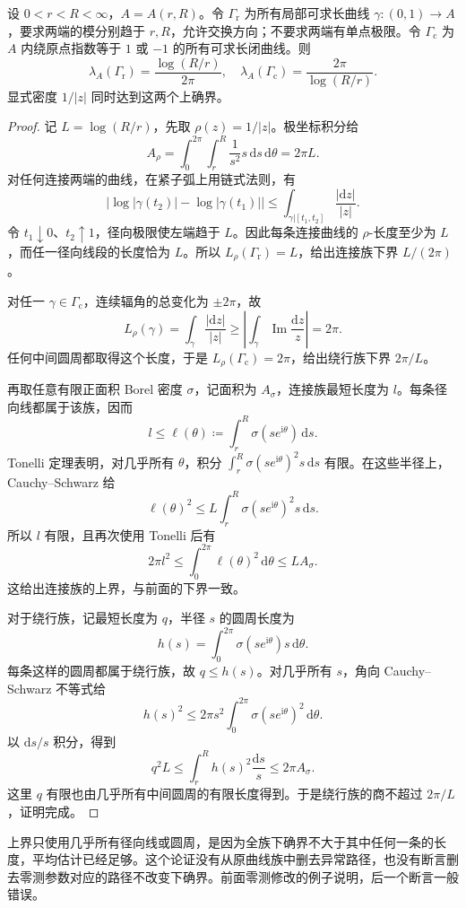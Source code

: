 \begin{theorem}[圆环两类曲线族的极值长度]\label{b3:thm:08-annulus-extremal}
设 \(0<r<R<\infty\)，\(A=A(r,R)\)。令 \(\Gamma_{\mathrm r}\) 为所有局部可求长曲线 \(\gamma:(0,1)\rightarrow A\)，要求两端的模分别趋于 \(r,R\)，允许交换方向；不要求两端有单点极限。令 \(\Gamma_{\mathrm c}\) 为 \(A\) 内绕原点指数等于 \(1\) 或 \(-1\) 的所有可求长闭曲线。则
\[
 \lambda_A(\Gamma_{\mathrm r})=\frac{\log(R/r)}{2\pi},\quad
 \lambda_A(\Gamma_{\mathrm c})=\frac{2\pi}{\log(R/r)}.
\]
显式密度 \(1/|z|\) 同时达到这两个上确界。
\end{theorem}
\begin{proof}
记 \(L=\log(R/r)\)，先取 \(\rho(z)=1/|z|\)。极坐标积分给
\[
 A_\rho=\int_0^{2\pi}\int_r^R\frac1{s^2}s\,\mathrm ds\,\mathrm d\theta
 =2\pi L.
\]
对任何连接两端的曲线，在紧子弧上用链式法则，有
\[
 \left|\log|\gamma(t_2)|-\log|\gamma(t_1)|\right|
 \le\int_{\gamma|[t_1,t_2]}\frac{|\mathrm dz|}{|z|}.
\]
令 \(t_1\downarrow0\)、\(t_2\uparrow1\)，径向极限使左端趋于 \(L\)。因此每条连接曲线的 \(\rho\)-长度至少为 \(L\)，而任一径向线段的长度恰为 \(L\)。所以 \(L_\rho(\Gamma_{\mathrm r})=L\)，给出连接族下界 \(L/(2\pi)\)。

对任一 \(\gamma\in\Gamma_{\mathrm c}\)，连续辐角的总变化为 \(\pm2\pi\)，故
\[
 L_\rho(\gamma)
 =\int_\gamma\frac{|\mathrm dz|}{|z|}
 \ge\left|\int_\gamma\operatorname{Im}\frac{\mathrm dz}{z}\right|
 =2\pi.
\]
任何中间圆周都取得这个长度，于是 \(L_\rho(\Gamma_{\mathrm c})=2\pi\)，给出绕行族下界 \(2\pi/L\)。

再取任意有限正面积 Borel 密度 \(\sigma\)，记面积为 \(A_\sigma\)，连接族最短长度为 \(l\)。每条径向线都属于该族，因而
\[
 l\le\ell(\theta)\coloneqq\int_r^R\sigma(se^{\mathrm i\theta})\,\mathrm ds.
\]
Tonelli 定理表明，对几乎所有 \(\theta\)，积分
\(\int_r^R\sigma(se^{\mathrm i\theta})^2s\,\mathrm ds\) 有限。在这些半径上，Cauchy--Schwarz 给
\[
 \ell(\theta)^2\le
 L\int_r^R\sigma(se^{\mathrm i\theta})^2s\,\mathrm ds.
\]
所以 \(l\) 有限，且再次使用 Tonelli 后有
\[
 2\pi l^2\le\int_0^{2\pi}\ell(\theta)^2\,\mathrm d\theta
 \le L A_\sigma.
\]
这给出连接族的上界，与前面的下界一致。

对于绕行族，记最短长度为 \(q\)，半径 \(s\) 的圆周长度为
\[
 h(s)=\int_0^{2\pi}\sigma(se^{\mathrm i\theta})s\,\mathrm d\theta.
\]
每条这样的圆周都属于绕行族，故 \(q\le h(s)\)。对几乎所有 \(s\)，角向 Cauchy--Schwarz 不等式给
\[
 h(s)^2\le2\pi s^2\int_0^{2\pi}\sigma(se^{\mathrm i\theta})^2\,\mathrm d\theta.
\]
以 \(\mathrm ds/s\) 积分，得到
\[
 q^2L\le\int_r^R h(s)^2\frac{\mathrm ds}{s}
 \le2\pi A_\sigma.
\]
这里 \(q\) 有限也由几乎所有中间圆周的有限长度得到。于是绕行族的商不超过 \(2\pi/L\)，证明完成。
\end{proof}
上界只使用几乎所有径向线或圆周，是因为全族下确界不大于其中任何一条的长度，平均估计已经足够。这个论证没有从原曲线族中删去异常路径，也没有断言删去零测参数对应的路径不改变下确界。前面零测修改的例子说明，后一个断言一般错误。

